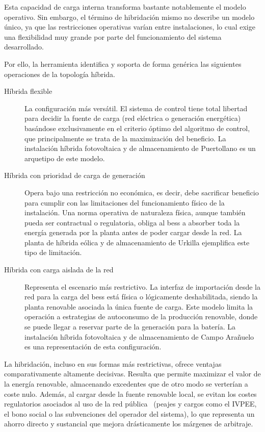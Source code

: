 Esta capacidad de carga interna transforma bastante notablemente el modelo operativo. Sin embargo, el término de hibridación mismo no describe un modelo único, ya que las restricciones operativas varían entre instalaciones, lo cual exige una flexibilidad muy grande por parte del funcionamiento del sistema desarrollado.

Por ello, la herramienta identifica y soporta de forma genérica las siguientes operaciones de la topología híbrida.

\begin{description}

  \item[Híbrida flexible] La configuración más versátil. El sistema de control tiene total libertad para decidir la fuente de carga (red eléctrica o generación energética) basándose exclusivamente en el criterio óptimo del algoritmo de control, que principalmente se trata de la maximización del beneficio. La instalación híbrida fotovoltaica y de almacenamiento de Puertollano es un arquetipo de este modelo.

  \item[Híbrida con prioridad de carga de generación] Opera bajo una restricción no económica, es decir, debe sacrificar beneficio para cumplir con las limitaciones del funcionamiento físico de la instalación. Una norma operativa de naturaleza física, aunque también pueda ser contractual o regulatoria, obliga al \gls{bess} a absorber toda la energía generada por la planta antes de poder cargar desde la red. La planta de híbrida eólica y de almacenamiento de Urkilla ejemplifica este tipo de limitación.

  \item[Híbrida con carga aislada de la red] Representa el escenario más restrictivo. La interfaz de importación desde la red para la carga del \gls{bess} está física o lógicamente deshabilitada, siendo la planta renovable asociada la única fuente de carga. Este modelo limita la operación a estrategias de autoconsumo de la producción renovable, donde se puede llegar a reservar parte de la generación para la batería. La instalación híbrida fotovoltaica y de almacenamiento de Campo Arañuelo es una representación de esta configuración.

\end{description}

La hibridación, incluso en sus formas más restrictivas, ofrece ventajas comparativamente altamente decisivas. Resulta que permite maximizar el valor de la energía renovable, almacenando excedentes que de otro modo se verterían a coste nulo. Además, al cargar desde la fuente renovable local, se evitan los costes regulatorios asociados al uso de la red pública~\cite{mterd2024orden} (peajes y cargos como el IVPEE, el bono social o las subvenciones del operador del sistema), lo que representa un ahorro directo y sustancial que mejora drásticamente los márgenes de arbitraje.

